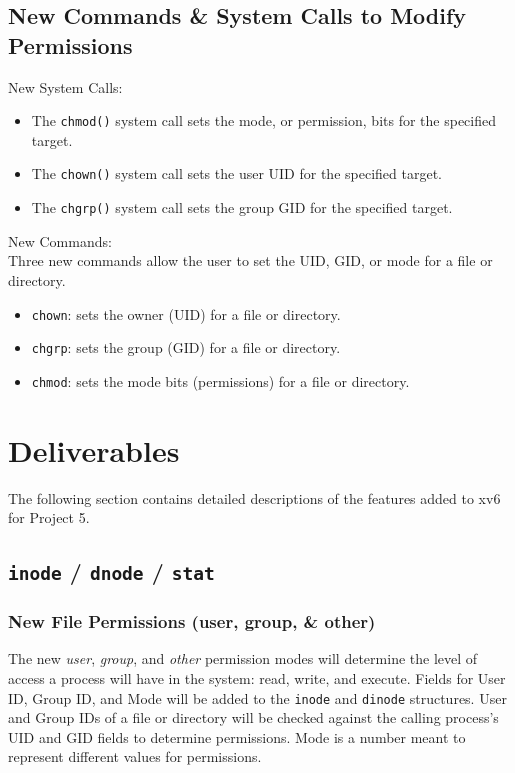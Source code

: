 \documentclass[11pt,letterpaper]{report}
\begin{document}
	\subsection{New  Commands \& System Calls to Modify Permissions}
	New System Calls:
	\begin{itemize}
		\item The {\tt chmod()} system call sets the mode, or permission, bits for the specified target.
		\item The {\tt chown()} system call sets the user UID for the specified target.
		\item The {\tt chgrp()} system call sets the group GID for the specified target.
	\end{itemize}
	New Commands:\\
	Three new commands allow the user to set the UID, GID, or mode for a file or directory.
	\begin{itemize}
		\item {\tt chown}: sets the owner (UID) for a file or directory.
		\item {\tt chgrp}: sets the group (GID) for a file or directory.
		\item {\tt chmod}: sets the mode bits (permissions) for a file or directory.
	\end{itemize}
	
	\newpage
	\section{Deliverables}
	The following section contains detailed descriptions of the features added to xv6 for Project 5.
	\subsection{{\tt inode} / {\tt dnode} / {\tt stat}}
	
	\subsubsection{New File Permissions (user, group, \& other)}
	The new \emph{user}, \emph{group}, and \emph{other} permission modes will determine the level of access a process will have in the system: read, write, and execute. Fields for User ID, Group ID, and Mode will be added to the {\tt inode} and {\tt dinode} structures. User and Group IDs of a file or directory will be checked against the calling process's UID and GID fields to determine permissions. Mode is a number meant to represent different values for permissions.
	
\end{document}
